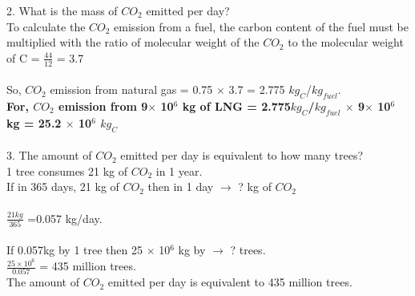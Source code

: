 \documentclass[11pt]{exam}
\begin{document}
\begin{questions}
{\begin{minipage}{42em}
                    2. What is the mass of $CO_{2}$ emitted per day? \\
                       To calculate the $CO_{2}$ emission from a fuel, the carbon content of the fuel must be multiplied with the ratio of molecular weight of the $CO_{2}$ to the molecular weight of C = $\frac{44}{12}$ = 3.7\\ \\
                       So, $CO_{2}$ emission from natural gas = 0.75 $\times$ 3.7 = 2.775 $kg_{C}$/$kg_{fuel}$. \\
                       
                       \textbf{For, $CO_{2}$ emission from 9$\times$ 10$^{6}$ kg of LNG = 2.775$kg_{C}$/$kg_{fuel}$ $\times$ 9$\times$ 10$^{6}$ kg = 25.2 $\times$ 10$^{6}$ $kg_{C}$} \\ \\
                    3. The amount of $CO_{2}$ emitted per day is equivalent to how many trees? \\
                      1 tree consumes 21 kg of $CO_{2}$ in 1 year. \\
                      If in 365 days, 21 kg of $CO_{2}$ then in 1 day $\rightarrow$ ? kg of $CO_{2}$ \\ \\
                      $\frac{21 kg}{365}$ =0.057 kg/day. \\ \\
                      If 0.057kg by 1 tree then 25 $\times$ 10$^{6}$ kg by $\rightarrow$ ? trees. \\
                      $\frac{25 \times 10^{6}}{0.057}$ = 435 million trees.\\
                      
                      The amount of $CO_{2}$ emitted per day is equivalent to 435 million trees. \\ \\

\end{minipage}} \\ \\                                                         
                     
\end{questions}
\end{document}
